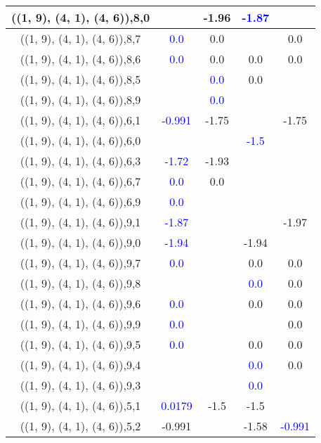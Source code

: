 \documentclass{article}
\begin{document}
\begin{center}
\begin{longtable}{|c|c|c|c|c|}
        	\hline
        	((1, 9), (4, 1), (4, 6)),8,0&&-1.96& \textcolor{blue}{-1.87}&\\
        	\hline
        	((1, 9), (4, 1), (4, 6)),8,7& \textcolor{blue}{0.0}&0.0&&0.0\\
        	\hline
        	((1, 9), (4, 1), (4, 6)),8,6& \textcolor{blue}{0.0}&0.0&0.0&0.0\\
        	\hline
        	((1, 9), (4, 1), (4, 6)),8,5&& \textcolor{blue}{0.0}&0.0&\\
        	\hline
        	((1, 9), (4, 1), (4, 6)),8,9&& \textcolor{blue}{0.0}&&\\
        	\hline
        	((1, 9), (4, 1), (4, 6)),6,1& \textcolor{blue}{-0.991}&-1.75&&-1.75\\
        	\hline
        	((1, 9), (4, 1), (4, 6)),6,0&&& \textcolor{blue}{-1.5}&\\
        	\hline
        	((1, 9), (4, 1), (4, 6)),6,3& \textcolor{blue}{-1.72}&-1.93&&\\
        	\hline
        	((1, 9), (4, 1), (4, 6)),6,7& \textcolor{blue}{0.0}&0.0&&\\
        	\hline
        	((1, 9), (4, 1), (4, 6)),6,9& \textcolor{blue}{0.0}&&&\\
        	\hline
        	((1, 9), (4, 1), (4, 6)),9,1& \textcolor{blue}{-1.87}&&&-1.97\\
        	\hline
        	((1, 9), (4, 1), (4, 6)),9,0& \textcolor{blue}{-1.94}&&-1.94&\\
        	\hline
        	((1, 9), (4, 1), (4, 6)),9,7& \textcolor{blue}{0.0}&&0.0&0.0\\
        	\hline
        	((1, 9), (4, 1), (4, 6)),9,8&&& \textcolor{blue}{0.0}&0.0\\
        	\hline
        	((1, 9), (4, 1), (4, 6)),9,6& \textcolor{blue}{0.0}&&0.0&0.0\\
        	\hline
        	((1, 9), (4, 1), (4, 6)),9,9& \textcolor{blue}{0.0}&&&0.0\\
        	\hline
        	((1, 9), (4, 1), (4, 6)),9,5& \textcolor{blue}{0.0}&&0.0&0.0\\
        	\hline
        	((1, 9), (4, 1), (4, 6)),9,4&&& \textcolor{blue}{0.0}&0.0\\
        	\hline
        	((1, 9), (4, 1), (4, 6)),9,3&&& \textcolor{blue}{0.0}&\\
        	\hline
        	((1, 9), (4, 1), (4, 6)),5,1& \textcolor{blue}{0.0179}&-1.5&-1.5&\\
        	\hline
        	((1, 9), (4, 1), (4, 6)),5,2&-0.991&&-1.58& \textcolor{blue}{-0.991}\\

\end{longtable}
\end{center}
\end{document}
